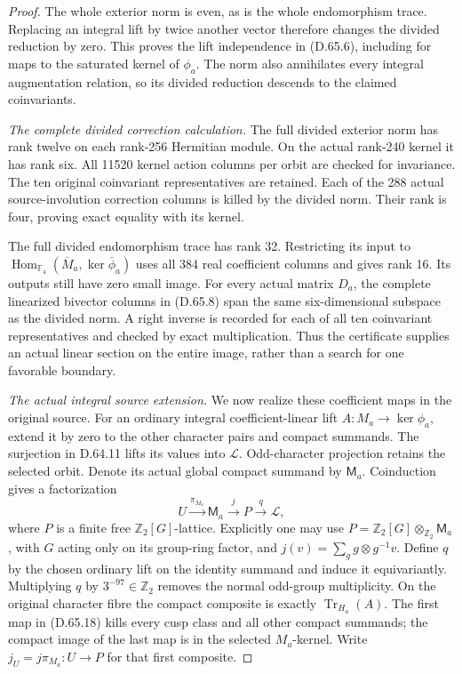 \begin{proof}
The whole exterior norm is even, as is the whole endomorphism trace.
Replacing an integral lift by twice another vector therefore changes
the divided reduction by zero. This proves the lift independence in
(D.65.6), including for maps to the saturated kernel of \(\phi_a\).
The norm also annihilates every integral augmentation relation, so
its divided reduction descends to the claimed coinvariants.

\emph{The complete divided correction calculation.}
The full divided exterior norm has rank twelve on each rank-256
Hermitian module. On the actual rank-240 kernel it has rank six.
All 11520 kernel action columns per orbit are checked for invariance.
The ten original coinvariant representatives are retained. Each of
the 288 actual source-involution correction columns is killed by
the divided norm. Their rank is four, proving exact equality with
its kernel.

The full divided endomorphism trace has rank 32. Restricting its
input to \(\operatorname{Hom}_{\mathbb F_4}
(\overline M_a,\ker\bar\phi_a)\) uses all 384 real coefficient
columns and gives rank 16. Its outputs still have zero small image.
For every actual matrix \(D_a\), the complete linearized bivector
columns in (D.65.8) span the same six-dimensional subspace as the
divided norm. A right inverse is recorded for each of all ten
coinvariant representatives and checked by exact multiplication.
Thus the certificate supplies an actual linear section on the
entire image, rather than a search for one favorable boundary.

\emph{The actual integral source extension.}
We now realize these coefficient maps in the original source.
For an ordinary integral coefficient-linear lift
\(A:M_a\to\ker\phi_a\), extend it by zero to the other character
pairs and compact summands. The surjection in D.64.11 lifts its
values into \(\mathcal L\). Odd-character projection retains the
selected orbit. Denote its actual global compact summand by
\(\mathsf M_a\). Coinduction gives a factorization
\[
 U\xrightarrow{\pi_{M_a}}\mathsf M_a
       \xrightarrow{j}P\xrightarrow{q}\mathcal L,
 \tag{D.65.18}
\]
where \(P\) is a finite free \(\mathbb Z_2[G]\)-lattice.
Explicitly one may use
\(P=\mathbb Z_2[G]\otimes_{\mathbb Z_2}\mathsf M_a\), with \(G\)
acting only on its group-ring factor, and
\(j(v)=\sum_g g\otimes g^{-1}v\). Define \(q\) by the chosen
ordinary lift on the identity summand and induce it equivariantly.
Multiplying \(q\) by \(3^{-97}\in\mathbb Z_2\) removes the normal
odd-group multiplicity. On the original character fibre the compact
composite is exactly \(\operatorname{Tr}_{H_a}(A)\). The first map
in (D.65.18) kills every cusp class and all other compact summands;
the compact image of the last map is in the selected \(M_a\)-kernel.
Write \(j_U=j\pi_{M_a}:U\to P\) for that first composite.


\end{proof}
